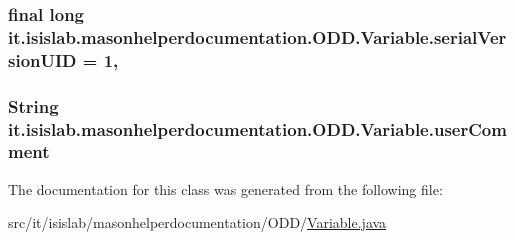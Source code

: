 \hypertarget{classit_1_1isislab_1_1masonhelperdocumentation_1_1_o_d_d_1_1_variable_a56e60bd2a6d65b85d1a67bc61a3c204c}{
\subsubsection[{serial\-Version\-U\-I\-D}]{\setlength{\rightskip}{0pt plus 5cm}final long it.\-isislab.\-masonhelperdocumentation.\-O\-D\-D.\-Variable.\-serial\-Version\-U\-I\-D = 1\hspace{0.3cm}{\ttfamily [static]}, {\ttfamily [private]}}}\label{classit_1_1isislab_1_1masonhelperdocumentation_1_1_o_d_d_1_1_variable_a56e60bd2a6d65b85d1a67bc61a3c204c}
\hypertarget{classit_1_1isislab_1_1masonhelperdocumentation_1_1_o_d_d_1_1_variable_abc4f019f82f47614b2b62743799dc7b5}{
\subsubsection[{user\-Comment}]{\setlength{\rightskip}{0pt plus 5cm}String it.\-isislab.\-masonhelperdocumentation.\-O\-D\-D.\-Variable.\-user\-Comment\hspace{0.3cm}{\ttfamily [package]}}}\label{classit_1_1isislab_1_1masonhelperdocumentation_1_1_o_d_d_1_1_variable_abc4f019f82f47614b2b62743799dc7b5}


The documentation for this class was generated from the following file\-:\begin{DoxyCompactItemize}
\item 
src/it/isislab/masonhelperdocumentation/\-O\-D\-D/\hyperlink{_variable_8java}{Variable.\-java}\end{DoxyCompactItemize}
